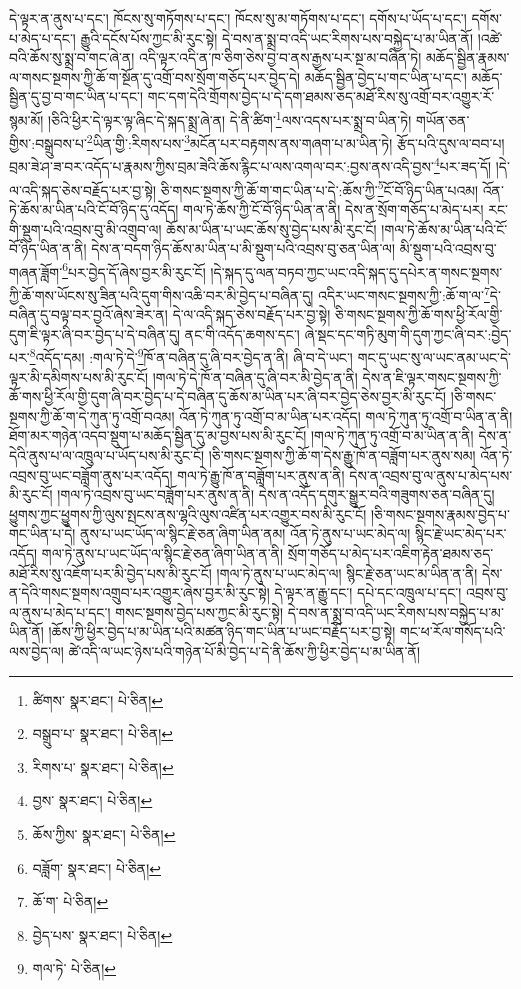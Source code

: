 དེ་ལྟར་ན་ནུས་པ་དང་། ཁོངས་སུ་གཏོགས་པ་དང་། ཁོངས་སུ་མ་གཏོགས་པ་དང་། དགོས་པ་ཡོད་པ་དང་། དགོས་པ་མེད་པ་དང་། རྒྱུའི་དངོས་པོས་ཀྱང་མི་རུང་སྟེ། དེ་བས་ན་སྨྲ་བ་འདི་ཡང་རིགས་པས་བསྐྱེད་པ་མ་ཡིན་ནོ། །འཚེ་བའི་ཆོས་སུ་སྨྲ་བ་གང་ཞེ་ན། འདི་ལྟར་འདི་ན་ཁ་ཅིག་ཅེས་བྱ་བ་ནས་རྒྱས་པར་སྔ་མ་བཞིན་ཏེ། མཆོད་སྦྱིན་རྣམས་ལ་གསང་སྔགས་ཀྱི་ཆོ་ག་སྔོན་དུ་འགྲོ་བས་སྲོག་གཅོད་པར་བྱེད་དེ། མཆོད་སྦྱིན་བྱེད་པ་གང་ཡིན་པ་དང་། མཆོད་སྦྱིན་དུ་བྱ་བ་གང་ཡིན་པ་དང་། གང་དག་དེའི་གྲོགས་བྱེད་པ་དེ་དག་ཐམས་ཅད་མཐོ་རིས་སུ་འགྲོ་བར་འགྱུར་རོ་སྙམ་མོ། །ཅིའི་ཕྱིར་དེ་ལྟར་ལྟ་ཞིང་དེ་སྐད་སྨྲ་ཞེ་ན། དེ་ནི་ཚིག་\footnote{ཚིགས་  སྣར་ཐང་།  པེ་ཅིན། }ལས་འདས་པར་སྨྲ་བ་ཡིན་ཏེ། གཡོན་ཅན་གྱིས་:བསྒྲུབས་པ་\footnote{བསྒྲུབ་པ་  སྣར་ཐང་།  པེ་ཅིན། }ཡིན་གྱི་:རིགས་པས་\footnote{རིགས་པ་  སྣར་ཐང་།  པེ་ཅིན། }མངོན་པར་བརྟགས་ནས་གཞག་པ་མ་ཡིན་ཏེ། རྩོད་པའི་དུས་ལ་བབ་པ། བྲམ་ཟེ་ཤ་ཟ་བར་འདོད་པ་རྣམས་ཀྱིས་བྲམ་ཟེའི་ཆོས་རྙིང་པ་ལས་འགལ་བར་:བྱས་ནས་འདི་བྱས་\footnote{བྱས་  སྣར་ཐང་།  པེ་ཅིན། }པར་ཟད་དོ། །དེ་ལ་འདི་སྐད་ཅེས་བརྗོད་པར་བྱ་སྟེ། ཅི་གསང་སྔགས་ཀྱི་ཆོ་ག་གང་ཡིན་པ་དེ་:ཆོས་ཀྱི་\footnote{ཆོས་ཀྱིས་  སྣར་ཐང་།  པེ་ཅིན། }ངོ་བོ་ཉིད་ཡིན་པའམ། འོན་ཏེ་ཆོས་མ་ཡིན་པའི་ངོ་བོ་ཉིད་དུ་འདོད། གལ་ཏེ་ཆོས་ཀྱི་ངོ་བོ་ཉིད་ཡིན་ན་ནི། དེས་ན་སྲོག་གཅོད་པ་མེད་པར། རང་གི་སྡུག་པའི་འབྲས་བུ་མི་འགྲུབ་ལ། ཆོས་མ་ཡིན་པ་ཡང་ཆོས་སུ་བྱེད་པས་མི་རུང་ངོ། །གལ་ཏེ་ཆོས་མ་ཡིན་པའི་ངོ་བོ་ཉིད་ཡིན་ན་ནི། དེས་ན་བདག་ཉིད་ཆོས་མ་ཡིན་པ་མི་སྡུག་པའི་འབྲས་བུ་ཅན་ཡིན་ལ། མི་སྡུག་པའི་འབྲས་བུ་གཞན་ཟློག་\footnote{བཟློག་  སྣར་ཐང་།  པེ་ཅིན། }པར་བྱེད་དོ་ཞེས་བྱར་མི་རུང་ངོ། །དེ་སྐད་དུ་ལན་བཏབ་ཀྱང་ཡང་འདི་སྐད་དུ་དཔེར་ན་གསང་སྔགས་ཀྱི་ཆོ་གས་ཡོངས་སུ་ཟིན་པའི་དུག་གིས་འཆི་བར་མི་བྱེད་པ་བཞིན་དུ། འདིར་ཡང་གསང་སྔགས་ཀྱི་:ཆོ་ག་ལ་\footnote{ཆོ་ག་  པེ་ཅིན། }དེ་བཞིན་དུ་བལྟ་བར་བྱའོ་ཞེས་ཟེར་ན། དེ་ལ་འདི་སྐད་ཅེས་བརྗོད་པར་བྱ་སྟེ། ཅི་གསང་སྔགས་ཀྱི་ཆོ་གས་ཕྱི་རོལ་གྱི་དུག་ཇི་ལྟར་ཞི་བར་བྱེད་པ་དེ་བཞིན་དུ། ནང་གི་འདོད་ཆགས་དང་། ཞེ་སྡང་དང་གཏི་མུག་གི་དུག་ཀྱང་ཞི་བར་:བྱེད་པར་\footnote{བྱེད་པས་  སྣར་ཐང་།  པེ་ཅིན། }འདོད་དམ། :གལ་ཏེ་དེ་\footnote{གལ་ཏེ་  པེ་ཅིན། }ཁོ་ན་བཞིན་དུ་ཞི་བར་བྱེད་ན་ནི། ཞི་བ་དེ་ཡང་། གང་དུ་ཡང་སུ་ལ་ཡང་ནམ་ཡང་དེ་ལྟར་མི་དམིགས་པས་མི་རུང་ངོ། །གལ་ཏེ་དེ་ཁོ་ན་བཞིན་དུ་ཞི་བར་མི་བྱེད་ན་ནི། དེས་ན་ཇི་ལྟར་གསང་སྔགས་ཀྱི་ཆོ་གས་ཕྱི་རོལ་གྱི་དུག་ཞི་བར་བྱེད་པ་དེ་བཞིན་དུ་ཆོས་མ་ཡིན་པར་ཞི་བར་བྱེད་ཅེས་བྱར་མི་རུང་ངོ། །ཅི་གསང་སྔགས་ཀྱི་ཆོ་ག་དེ་ཀུན་ཏུ་འགྲོ་བའམ། འོན་ཏེ་ཀུན་ཏུ་འགྲོ་བ་མ་ཡིན་པར་འདོད། གལ་ཏེ་ཀུན་ཏུ་འགྲོ་བ་ཡིན་ན་ནི། ཐོག་མར་གཉེན་འདབ་སྡུག་པ་མཆོད་སྦྱིན་དུ་མ་བྱས་པས་མི་རུང་ངོ། །གལ་ཏེ་ཀུན་ཏུ་འགྲོ་བ་མ་ཡིན་ན་ནི། དེས་ན་དེའི་ནུས་པ་ལ་འཁྲུལ་པ་ཡོད་པས་མི་རུང་ངོ། །ཅི་གསང་སྔགས་ཀྱི་ཆོ་ག་དེས་རྒྱུ་ཁོ་ན་བཟློག་པར་ནུས་སམ། འོན་ཏེ་འབྲས་བུ་ཡང་བཟློག་ནུས་པར་འདོད། གལ་ཏེ་རྒྱུ་ཁོ་ན་བཟློག་པར་ནུས་ན་ནི། དེས་ན་འབྲས་བུ་ལ་ནུས་པ་མེད་པས་མི་རུང་ངོ། །གལ་ཏེ་འབྲས་བུ་ཡང་བཟློག་པར་ནུས་ན་ནི། དེས་ན་འདོད་དགུར་སྒྱུར་བའི་གཟུགས་ཅན་བཞིན་དུ། ཕྱུགས་ཀྱང་ཕྱུགས་ཀྱི་ལུས་སྤངས་ནས་ལྷའི་ལུས་འཛིན་པར་འགྱུར་བས་མི་རུང་ངོ། །ཅི་གསང་སྔགས་རྣམས་བྱེད་པ་གང་ཡིན་པ་དེ། ནུས་པ་ཡང་ཡོད་ལ་སྙིང་རྗེ་ཅན་ཞིག་ཡིན་ནམ། འོན་ཏེ་ནུས་པ་ཡང་མེད་ལ། སྙིང་རྗེ་ཡང་མེད་པར་འདོད། གལ་ཏེ་ནུས་པ་ཡང་ཡོད་ལ་སྙིང་རྗེ་ཅན་ཞིག་ཡིན་ན་ནི། སྲོག་གཅོད་པ་མེད་པར་འཇིག་རྟེན་ཐམས་ཅད་མཐོ་རིས་སུ་འཇོག་པར་མི་བྱེད་པས་མི་རུང་ངོ། །གལ་ཏེ་ནུས་པ་ཡང་མེད་ལ། སྙིང་རྗེ་ཅན་ཡང་མ་ཡིན་ན་ནི། དེས་ན་དེའི་གསང་སྔགས་འགྲུབ་པར་འགྱུར་ཞེས་བྱར་མི་རུང་སྟེ། དེ་ལྟར་ན་རྒྱུ་དང་། དཔེ་དང་འཁྲུལ་པ་དང་། འབྲས་བུ་ལ་ནུས་པ་མེད་པ་དང་། གསང་སྔགས་བྱེད་པས་ཀྱང་མི་རུང་སྟེ། དེ་བས་ན་སྨྲ་བ་འདི་ཡང་རིགས་པས་བསྐྱེད་པ་མ་ཡིན་ནོ། །ཆོས་ཀྱི་ཕྱིར་བྱེད་པ་མ་ཡིན་པའི་མཚན་ཉིད་གང་ཡིན་པ་ཡང་བརྗོད་པར་བྱ་སྟེ། གང་ཕ་རོལ་གསོད་པའི་ལས་བྱེད་ལ། ཚེ་འདི་ལ་ཡང་ཉེས་པའི་གཉེན་པོ་མི་བྱེད་པ་དེ་ནི་ཆོས་ཀྱི་ཕྱིར་བྱེད་པ་མ་ཡིན་ནོ། 
